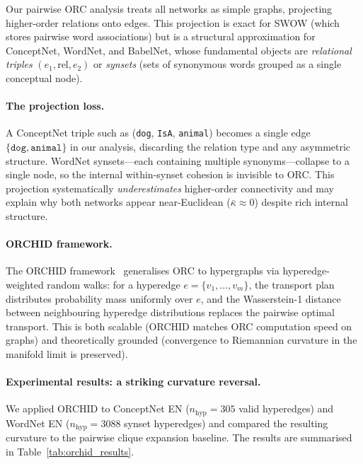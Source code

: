 \documentclass[11pt,a4paper]{article}
\newcommand{\kbar}{\bar{\kappa}}
\begin{document}
Our pairwise ORC analysis treats all networks as simple graphs, projecting higher-order relations onto edges. This projection is exact for SWOW (which stores pairwise word associations) but is a structural approximation for ConceptNet, WordNet, and BabelNet, whose fundamental objects are \emph{relational triples} $(e_1, \mathrm{rel}, e_2)$ or \emph{synsets} (sets of synonymous words grouped as a single conceptual node).

\paragraph{The projection loss.}
A ConceptNet triple such as (\texttt{dog}, \texttt{IsA}, \texttt{animal}) becomes a single edge $\{\texttt{dog}, \texttt{animal}\}$ in our analysis, discarding the relation type and any asymmetric structure. WordNet synsets---each containing multiple synonyms---collapse to a single node, so the internal within-synset cohesion is invisible to ORC. This projection systematically \emph{underestimates} higher-order connectivity and may explain why both networks appear near-Euclidean ($\kbar \approx 0$) despite rich internal structure.

\paragraph{ORCHID framework.}
The ORCHID framework~\cite{leal2023orchid} generalises ORC to hypergraphs via hyperedge-weighted random walks: for a hyperedge $e = \{v_1,\ldots,v_m\}$, the transport plan distributes probability mass uniformly over $e$, and the Wasserstein-1 distance between neighbouring hyperedge distributions replaces the pairwise optimal transport. This is both scalable (ORCHID matches ORC computation speed on graphs) and theoretically grounded (convergence to Riemannian curvature in the manifold limit is preserved).

\paragraph{Experimental results: a striking curvature reversal.}
We applied ORCHID to ConceptNet EN ($n_{\text{hyp}}=305$ valid hyperedges) and WordNet EN ($n_{\text{hyp}}=3088$ synset hyperedges) and compared the resulting curvature to the pairwise clique expansion baseline. The results are summarised in Table~\ref{tab:orchid_results}.
\end{document}
